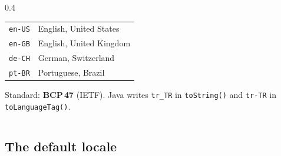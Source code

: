 \documentclass[aspectratio=169,10pt,compress]{beamer}
\begin{document}
\begin{frame}[t,fragile]
\begin{columns}[T]
\begin{column}{0.4\textwidth}
\begin{center}
\begin{tabular}{ll}
        \texttt{en-US}  & English, United States \\
        \texttt{en-GB}  & English, United Kingdom \\
        \texttt{de-CH}  & German, Switzerland \\
        \texttt{pt-BR}  & Portuguese, Brazil \\
        \bottomrule
      \end{tabular}
      \end{center}
      \small Standard: \textbf{BCP\,47} (IETF). Java writes \texttt{tr\_TR} in \texttt{toString()}
      and \texttt{tr-TR} in \texttt{toLanguageTag()}.
    \end{column}
  \end{columns}
\end{frame}

\subsection[Default]{The default locale}
\end{document}

